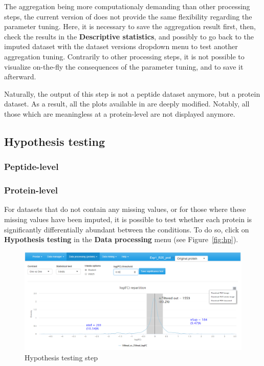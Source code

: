 \documentclass[12pt]{article}
\begin{document}
The aggregation being more computationaly demanding than other processing 
steps, the current version of  does not provide the same 
flexibility regarding the parameter tuning. Here, it is necessary to save the 
aggregation result first, then, check the results in the \textbf{Descriptive statistics},
and possibly to go back to the imputed dataset with the dataset 
versions dropdown menu to test another aggregation tuning. Contrarily to 
other processing steps, it is not possible to visualize on-the-fly the 
consequences of the parameter tuning, and to save it afterward. 

Naturally, the output of this step is not a peptide dataset anymore, but a 
protein dataset. As a result, all the plots available in  
are deeply modified. Notably, all those which are meaningless at a protein-level
are not displayed anymore.


\subsection{Hypothesis testing}\label{sec:hp}

\subsubsection{Peptide-level}\label{sec:peptidehp}


\subsubsection{Protein-level}\label{sec:proteinhp}
For datasets that do not contain any missing values, 
or for those where these missing values have been imputed, 
it is possible to test whether each protein is significantly 
differentially abundant between the conditions.
To do so, click on \textbf{Hypothesis testing} in the \textbf{Data processing} menu (see Figure~\ref{fig:hp}). 

\begin {figure}
\includegraphics[width=\textwidth]{images/hp.png}
\caption{Hypothesis testing step}
\label{fig:anadiff1}
\end {figure}
\end{document}
